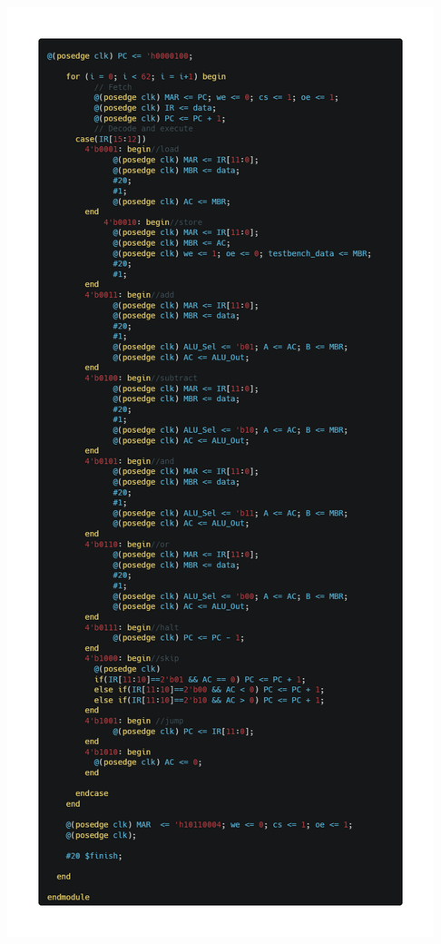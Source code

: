 \documentclass[12pt]{article}
\begin{document}
\begin{center}
    \includegraphics[scale=0.35]{images/b_2.png}
\end{center}
\end{document}
